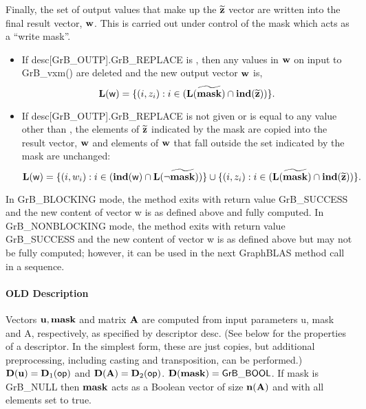 Finally, the set of output values that make up the ${\bf \widetilde{z}}$ 
vector are written into the final result vector, ${\bf w}$. 
This is carried out under control of the mask which acts as a ``write mask''.
\begin{itemize}
\item If {\sf desc[GrB\_OUTP].GrB\_REPLACE} is \true, then any values in ${\bf w}$ 
on input to {\sf GrB\_vxm()} are deleted and the new output vector ${\bf w}$ is,
\[ \bold{L}({\sf w}) = \{(i,z_{i}) : i \in (\bold{L}({\bf \widetilde{mask}}) 
\cap \bold{ind}({\bf \widetilde{z}})) \}. \]

\item If {\sf desc[GrB\_OUTP].GrB\_REPLACE} is not given or is equal to any 
value other than \true, the elements of ${\bf \widetilde{z}}$ indicated by 
the mask are copied into the result vector, ${\bf w}$ and elements of 
${\bf w}$ that fall outside the set indicated by the mask are unchanged:
\[ \bold{L}({\sf w}) = \{(i,w_{i}) : i \in (\bold{ind}({\bf \sf w}) 
\cap \bold{L}(\neg {\bf \widetilde{mask}})) \} \cup \{(i,z_{i}) : i \in 
(\bold{L}({\bf \widetilde{mask}}) \cap \bold{ind}({\bf \widetilde{z}})) \}. \]
\end{itemize}

In {\sf GrB\_BLOCKING} mode, the method exits with return value 
{\sf GrB\_SUCCESS} and the new content of vector {\sf w} is as defined above
and fully computed.  
In {\sf GrB\_NONBLOCKING} mode, the method exits with return value 
{\sf GrB\_SUCCESS} and the new content of vector {\sf w} is as defined above 
but may not be fully computed; however, it can be used in the next GraphBLAS 
method call in a sequence.



\paragraph{OLD Description}

Vectors ${\bf u}, {\bf mask}$ and matrix ${\bf A}$ are computed from
input parameters {\sf u}, {\sf mask} and {\sf A}, respectively, as specified
by descriptor {\sf desc}. (See below for the properties of a descriptor. In
the simplest form, these are just copies, but additional preprocessing,
including casting and transposition, can be performed.)  $\bold{D}({\bf u}) =
\bold{D}_1({\sf op})$ and $\bold{D}({\bf A}) = \bold{D}_2({\sf op})$.
$\bold{D}({\bf mask}) = {\sf GrB\_BOOL}$.  If {\sf mask} is {\sf GrB\_NULL}
then ${\bf mask}$ acts as a Boolean vector of size $\bold{n}({\bf A})$
and with all elements set to {\sf true}.

